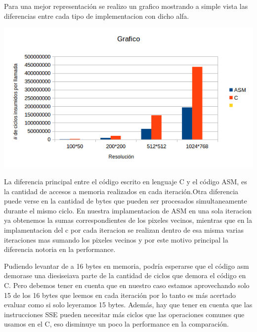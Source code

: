  Para una mejor representación se realizo un grafico mostrando a simple vista
 las diferencias entre cada tipo de implementacion con dicho alfa.
 \vspace*{0.3cm} \vspace*{0.3cm}
  \begin{center}
 \includegraphics[scale=1]{ldr-.png}
 \end{center}
  \vspace*{0.3cm} 
  
  
La diferencia principal entre el c\'odigo escrito en lenguaje C y el c\'odigo ASM, es la cantidad de accesos 
a memoria realizados en cada iteraci\'on.Otra diferencia puede verse en la cantidad de bytes que pueden 
ser procesados simultaneamente durante el mismo ciclo. En nuestra implamentacion de ASM en una sola iteracion ya
obtenemos la sumas correspondientes de los pixeles vecinos, mientras que en la implamentacion del c por cada iteracion
se realizan dentro de esa misma varias iteraciones mas sumando los pixeles vecinos y por este motivo principal
la diferencia notoria en la performance.\vspace*{0.2cm}

Pudiendo levantar de a 16 bytes en memoria, podr\'ia esperarse que el c\'odigo asm demorase una 
diesiseiava parte de la cantidad de ciclos que demora el c\'odigo en C.
Pero debemos tener en cuenta que en nuestro caso estamos aprovechando solo 15 de los 16 bytes que leemos 
en cada iteraci\'on por lo tanto es más acertado evaluar como si solo leyeramos 15 bytes. 
Adem\'as, hay que tener en cuenta que las instrucciones SSE pueden necesitar más ciclos que las operaciones 
comunes que usamos en el C, eso disminuye un poco la performance en la comparación. 
\vspace*{0.3cm} \vspace*{0.3cm} 
